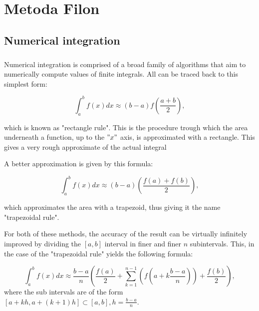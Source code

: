 \chapter{Metoda Filon}
\label{cap:cap2}

\section{Numerical integration}

\paragraph{} Numerical integration is comprised of a broad family of algorithms that aim to numerically compute values of finite integrals.
All can be traced back to this simplest form:

\begin{equation}
    \int_a^b f(x) dx \approx (b-a) f\left(\frac{a+b}{2}\right),\label{rectangle}
\end{equation}

which is known as "rectangle rule". This is the procedure trough which the area underneath a function, up to the $"x"$ axis, is approximated with a rectangle. This gives a very rough approximate of the actual integral



A better approximation is given by this formula: 

\begin{equation}
    \int_a^b f(x) dx \approx (b-a) \left(\frac{f(a)+f(b)}{2}\right),\label{trapezoid}
\end{equation}

which approximates the area with a trapezoid, thus giving it the name "trapezoidal rule".


For both of these methods, the accuracy of the result can be virtually infinitely improved by dividing the $[a,b]$ interval in finer and finer $n$ subintervals.
This, in the case of the "trapezoidal rule" yields the following formula:

\begin{equation}
    \int_a^b f(x) dx \approx \frac{b-a}{n}\left(\frac{f(a)}{2}+\sum_{k=1}^{n-1}\left(f\left(a+k\frac{b-a}{n}\right)\right)+\frac{f(b)}{2}\right),\label{composite}
\end{equation}
where the sub intervals are of the form $ [a+kh,a+(k+1)h] \subset [a,b], h=\frac{b-a}{n} $.

